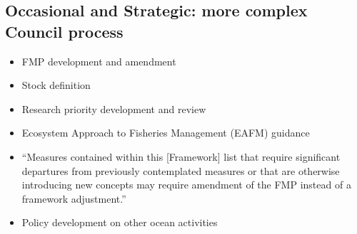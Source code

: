 \documentclass[
]{article}
\providecommand{\tightlist}{%
  \setlength{\itemsep}{0pt}\setlength{\parskip}{0pt}}
\begin{document}
\begin{ltpurplebox}

\subsection{Occasional and Strategic: more complex Council
process}\label{occasional-and-strategic-more-complex-council-process}

\begin{itemize}
\tightlist
\item
  FMP development and amendment
\item
  Stock definition
\item
  Research priority development and review
\item
  Ecosystem Approach to Fisheries Management (EAFM) guidance
\item
  ``Measures contained within this {[}Framework{]} list that require
  significant departures from previously contemplated measures or that
  are otherwise introducing new concepts may require amendment of the
  FMP instead of a framework adjustment.''
\item
  Policy development on other ocean activities\\
\end{itemize}

\end{ltpurplebox}
\end{document}
